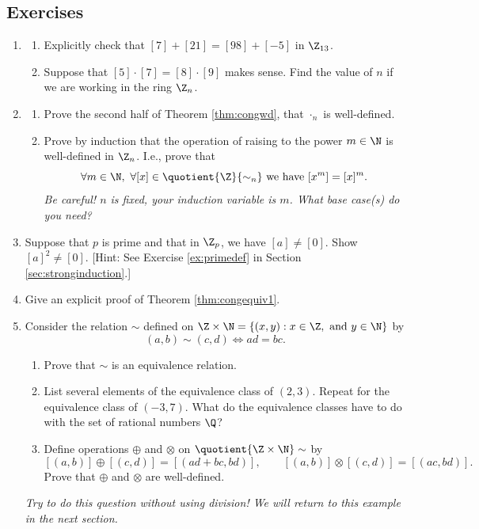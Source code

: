 \subsection*{Exercises}

\begin{enumerate}\renewcommand{\labelenumi}{\thesubsection.\theenumi}
  \item\begin{enumerate}
    \item Explicitly check that $[7]+[21]=[98]+[-5]$ in $\Z_{13}$.
    \item Suppose that $[5]\cdot[7]=[8]\cdot[9]$ makes sense. Find the value of $n$ if we are working in the ring $\Z_n$.
  \end{enumerate}\pagebreak[2]
  
  \item\begin{enumerate}
    \item Prove the second half of Theorem \ref{thm:congwd}, that $\cdot_n$ is well-defined.
	  \item Prove by induction that the operation of raising to the power $m\in\N$ is well-defined in $\Z_n$. I.e., prove that
  \[\forall m\in\N,\ \forall [x]\in\quotient{\Z}{\sim_n}\text{ we have } [x^m]=[x]^m.\]
  \emph{Be careful! $n$ is fixed, your induction variable is $m$. What base case(s) do you need?}
  \end{enumerate} 
  
  \item Suppose that $p$ is prime and that in $\Z_p$, we have $[a] \neq [0]$. Show $[a]^2 \neq [0]$. [Hint: See Exercise \ref{ex:primedef} in Section \ref{sec:stronginduction}.]
  
  \item Give an explicit proof of Theorem \ref{thm:congequiv1}.
  
  \item\label{ex:qequiv} Consider the relation $\sim$ defined on $\Z\times\N=\{(x,y):x\in\Z,\text{ and }y\in\N\}$ by
  \[(a,b)\sim(c,d)\iff ad=bc.\]
  \begin{enumerate}
    \item Prove that $\sim$ is an equivalence relation.
    \item List several elements of the equivalence class of $(2,3)$. Repeat for the equivalence class of $(-3,7)$. What do the equivalence classes have to do with the set of rational numbers $\Q$?
    \item Define operations $\oplus$ and $\otimes$ on $\quotient{\Z\times\N}\sim$ by
    \[[(a,b)]\oplus[(c,d)]=[(ad+bc,bd)],\qquad [(a,b)]\otimes[(c,d)]=[(ac,bd)].\]
    Prove that $\oplus$ and $\otimes$ are well-defined.
  \end{enumerate}
  \emph{Try to do this question \emph{without} using division! We will return to this example in the next section.}
\end{enumerate}
\newpage

